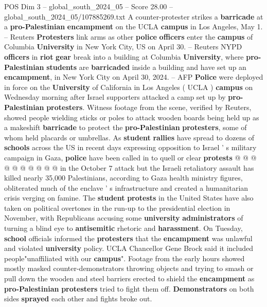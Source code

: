 \begin{textsample}{POS Dim 3 – global\_south\_2024\_05 – Score 28.00 – global\_south\_2024\_05/107885269.txt}  \label{ex:f3_pos_093}
A counter-protester strikes a \textbf{barricade} at a \textbf{pro-Palestinian} \textbf{encampment} on the UCLA \textbf{campus} in Los Angeles, May 1. -- Reuters \textbf{Protesters} link arms as other \textbf{police} \textbf{officers} enter the \textbf{campus} of Columbia \textbf{University} in New York City, US on April 30. -- Reuters NYPD \textbf{officers} in \textbf{riot} \textbf{gear} break into a building at Columbia \textbf{University}, where \textbf{pro-Palestinian} \textbf{students} are \textbf{barricaded} inside a building and have set up an \textbf{encampment}, in New York City on April 30, 2024. -- AFP \textbf{Police} were deployed in force on the \textbf{University} of California in Los Angeles ( UCLA ) \textbf{campus} on Wednesday morning after Israel supporters attacked a camp set up by \textbf{pro-Palestinian} \textbf{protesters}.
Witness footage from the scene, verified by Reuters, showed people wielding sticks or poles to attack wooden boards being held up as a makeshift \textbf{barricade} to protect the \textbf{pro-Palestinian} \textbf{protesters}, some of whom held placards or umbrellas.
As \textbf{student} \textbf{rallies} have spread to dozens of \textbf{schools} across the US in recent days expressing opposition to Israel ' s military campaign in Gaza, \textbf{police} have been called in to quell or clear \textbf{protests} @ @ @ @ @ @ @ @ @ @ in the October 7 attack but the Israeli retaliatory assault has killed nearly 35,000 Palestinians, according to Gaza health ministry figures, obliterated much of the enclave ' s infrastructure and created a humanitarian crisis verging on famine.
The \textbf{student} \textbf{protests} in the United States have also taken on political overtones in the run-up to the presidential election in November, with Republicans accusing some \textbf{university} \textbf{administrators} of turning a blind eye to \textbf{antisemitic} rhetoric and \textbf{harassment}.
On Tuesday, \textbf{school} officials informed the \textbf{protesters} that the \textbf{encampment} was unlawful and violated \textbf{university} policy.
UCLA Chancellor Gene Brock said it included people"unaffiliated with our \textbf{campus}".
Footage from the early hours showed mostly masked counter-demonstrators throwing objects and trying to smash or pull down the wooden and steel barriers erected to shield the \textbf{encampment} as \textbf{pro-Palestinian} \textbf{protesters} tried to fight them off. \textbf{Demonstrators} on both sides \textbf{sprayed} each other and fights broke out.

\end{textsample}
